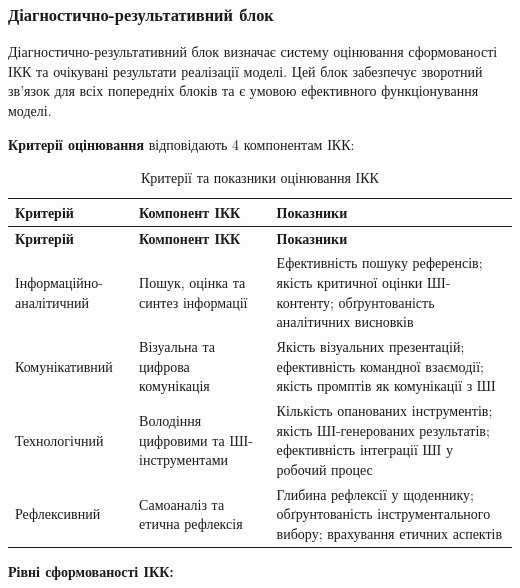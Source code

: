 \subsubsection{Діагностично-результативний блок}\label{sssec:3.1.5}

Діагностично-результативний блок визначає систему оцінювання сформованості ІКК та очікувані результати реалізації моделі. Цей блок забезпечує зворотний зв'язок для всіх попередніх блоків та є умовою ефективного функціонування моделі.

\textbf{Критерії оцінювання} відповідають 4 компонентам ІКК:

\begin{longtable}{@{}p{}p{}p{}@{}}
\caption{Критерії та показники оцінювання ІКК}\label{tab:ikk-criteria} \\
\hline
\textbf{Критерій} & \textbf{Компонент ІКК} & \textbf{Показники} \\
\hline
\endfirsthead
\hline
\textbf{Критерій} & \textbf{Компонент ІКК} & \textbf{Показники} \\
\hline
\endhead
Інформаційно-аналітичний & Пошук, оцінка та синтез інформації & Ефективність пошуку референсів; якість критичної оцінки ШІ-контенту; обґрунтованість аналітичних висновків \\
\addlinespace
Комунікативний & Візуальна та цифрова комунікація & Якість візуальних презентацій; ефективність командної взаємодії; якість промптів як комунікації з ШІ \\
\addlinespace
Технологічний & Володіння цифровими та ШІ-інструментами & Кількість опанованих інструментів; якість ШІ-генерованих результатів; ефективність інтеграції ШІ у робочий процес \\
\addlinespace
Рефлексивний & Самоаналіз та етична рефлексія & Глибина рефлексії у щоденнику; обґрунтованість інструментального вибору; врахування етичних аспектів \\
\hline
\end{longtable}

\textbf{Рівні сформованості ІКК:}

